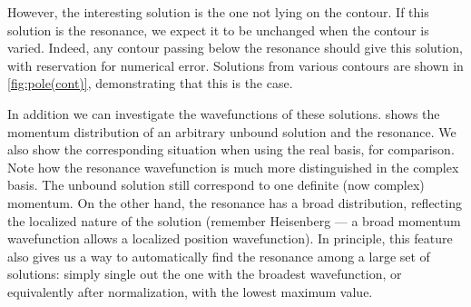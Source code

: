 \documentclass[../main/report.tex]{subfiles}
\begin{document}
However, the interesting solution is the one not lying on the contour. If this solution is the resonance, we expect it to be unchanged when the contour is varied. 
Indeed, any contour passing below the resonance should give this solution, with reservation for numerical error. 
Solutions from various contours are shown in \cref{fig:pole(cont)}, demonstrating that this is the case.

In addition we can investigate the wavefunctions of these solutions. 
 shows the momentum distribution of an arbitrary unbound solution and the resonance. We also show the corresponding situation when using the real basis, for comparison. Note how the resonance wavefunction is much more distinguished in the complex basis.  
The unbound solution still correspond to one definite (now complex) momentum. 
On the other hand, the resonance has a broad distribution, reflecting the localized nature of the solution 
(remember Heisenberg --- a broad momentum wavefunction allows a localized position wavefunction). 
In principle, this feature also gives us a way to automatically find the resonance among a large set of solutions: 
simply single out the one with the broadest wavefunction, or equivalently after normalization, with the lowest maximum value.

\end{document}
